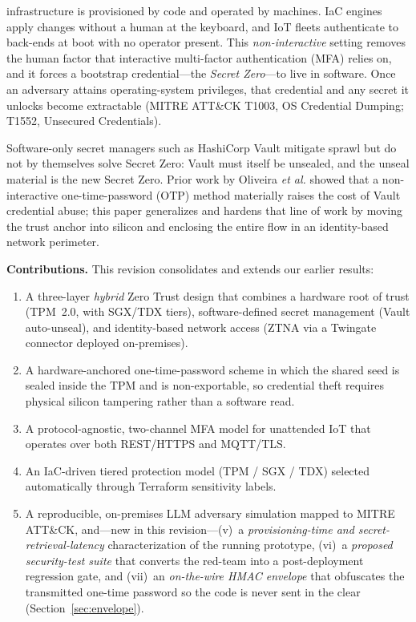 \documentclass[journal]{IEEEtran}
\begin{document}
 infrastructure is provisioned by code and operated by
machines. IaC engines apply changes without a human at the keyboard, and IoT
fleets authenticate to back-ends at boot with no operator present. This
\emph{non-interactive} setting removes the human factor that interactive
multi-factor authentication (MFA) relies on, and it forces a bootstrap
credential---the \emph{Secret Zero}---to live in software. Once an adversary
attains operating-system privileges, that credential and any secret it
unlocks become extractable (MITRE ATT\&CK T1003, OS Credential Dumping;
T1552, Unsecured Credentials).

Software-only secret managers such as HashiCorp Vault mitigate sprawl but do
not by themselves solve Secret Zero: Vault must itself be unsealed, and the
unseal material is the new Secret Zero. Prior work by Oliveira \emph{et al.}
\cite{oliveira2024} showed that a non-interactive one-time-password (OTP)
method materially raises the cost of Vault credential abuse; this paper
generalizes and hardens that line of work by moving the trust anchor into
silicon and enclosing the entire flow in an identity-based network perimeter.

\textbf{Contributions.} This revision consolidates and extends our earlier
results:
\begin{enumerate}
\item A three-layer \emph{hybrid} Zero Trust design that combines a hardware
root of trust (TPM~2.0, with SGX/TDX tiers), software-defined secret
management (Vault auto-unseal), and identity-based network access (ZTNA via a
Twingate connector deployed on-premises).
\item A hardware-anchored one-time-password scheme in which the shared seed is
sealed inside the TPM and is non-exportable, so credential theft requires
physical silicon tampering rather than a software read.
\item A protocol-agnostic, two-channel MFA model for unattended IoT that
operates over both REST/HTTPS and MQTT/TLS.
\item An IaC-driven tiered protection model (TPM / SGX / TDX) selected
automatically through Terraform sensitivity labels.
\item A reproducible, on-premises LLM adversary simulation mapped to MITRE
ATT\&CK, and---new in this revision---(v)~a \emph{provisioning-time and
secret-retrieval-latency} characterization of the running prototype,
(vi)~a \emph{proposed security-test suite} that converts the red-team into a
post-deployment regression gate, and (vii)~an \emph{on-the-wire HMAC envelope}
that obfuscates the transmitted one-time password so the code is never sent in
the clear (Section~\ref{sec:envelope}).
\end{enumerate}
\end{document}

